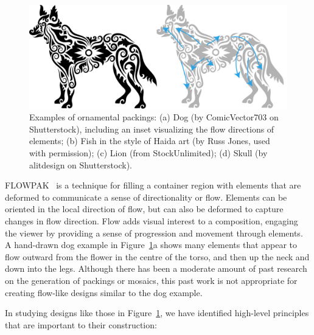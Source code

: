 \begin{figure}[t!] %
\centering
\includegraphics[width=1.0\textwidth]{figures/flowpak/dog_ornament_flow.pdf}
\caption[An example of flow visual style]{
  \label{dog_flow}  
Examples of ornamental packings: 
(a) Dog (by ComicVector703 on Shutterstock), 
including an inset visualizing the flow directions of elements; 
(b) Fish in the style of Haida art (by Russ Jones, used with permission); 
(c) Lion (from StockUnlimited);  
(d) Skull (by alitdesign on Shutterstock).
}
\end{figure}


\newtext
{
FLOWPAK~\cite{Saputra2017} is a technique for filling a container 
region with elements that are deformed 
to communicate a sense of directionality or flow.
Elements can be oriented in the local direction 
of flow, but can also be deformed to capture changes in flow direction.
Flow adds visual interest to a composition,
engaging the viewer by providing a sense of progression and
movement through elements.
A hand-drawn dog example in Figure~\ref{dog_flow}a shows many elements that appear to flow
outward from the flower in the centre of the torso, and then
up the neck and down into the legs.
Although there has been a moderate amount of past research on
the generation of packings or mosaics,
this past work is not appropriate for creating flow-like
designs similar to the dog example.
}

In studying designs like those in Figure~\ref{dog_flow}, we 
have identified high-level principles that are important
to their construction:

